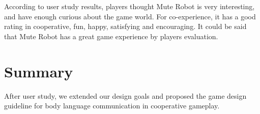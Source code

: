 \documentclass{sigchi}
\begin{document}

According to user study results, players thought Mute Robot is very interesting, and have enough curious about the game world. For co-experience, it has a good rating in cooperative, fun, happy, satisfying and encouraging. It could be said that Mute Robot has a great game experience by players evaluation. 


\section{Summary}

After user study, we extended our design goals and proposed the game design guideline for body language communication in cooperative gameplay.
\end{document}
